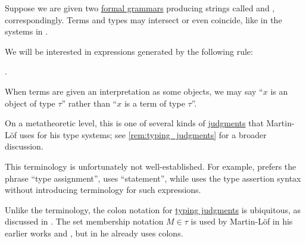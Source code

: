 \begin{definition}\label{def:type_assertion}\mimprovised
  Suppose we are given two \hyperref[def:formal_grammar/schema]{formal grammars} producing strings called  and , correspondingly. Terms and types may intersect or even coincide, like in the systems in .

  We will be interested in expressions generated by the following rule:
  \begin{bnf*}
     { \bnfsp \bnftsq{\( : \)} \bnfsp {}}.
  \end{bnf*}
\end{definition}
\begin{comments}
  \item When terms are given an interpretation as some objects, we may say \enquote{\( x \) is an object of type \( \tau \)} rather than \enquote{\( x \) is a term of type \( \tau \)}.

  \item On a metatheoretic level, this is one of several kinds of \hyperref[con:judgment]{judgments} that Martin-L\"of uses for his type systems; see \cref{rem:typing_judgments} for a broader discussion.

  \item This terminology is unfortunately not well-established. For example, \textcite[def. 2A4]{Hindley1997BasicSTT} prefers the phrase \enquote{type assignment}, \textcite[def. 5.1.10]{Barendregt1992LambdaCalculiWithTypes} uses \enquote{statement}, while \textcite[ch. 4]{Mimram2020ProgramEqualsProof} uses the type assertion syntax without introducing terminology for such expressions.

  \item Unlike the terminology, the colon notation for \hyperref[rem:typing_judgments]{typing judgments} is ubiquitous, as discussed in \cite{MathSE:origin_of_colon_notation_for_type_assertions}. The set membership notation \( M \in \tau \) is used by Martin-L\"of in his earlier works \cite{MartinLöf1975IntuitionisticTypeTheory} and \cite{MartinLöf1984IntuitionisticTypeTheory}, but in \cite{MartinLöf1994TypeJudgments} he already uses colons.
\end{comments}


